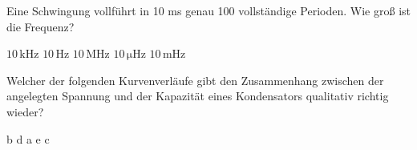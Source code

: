 \documentclass[11pt]{exam}
\begin{document}
\begin{questions}
\vspace{3mm}\question Eine Schwingung vollführt in 10 ms genau 100 vollständige Perioden. Wie groß ist die Frequenz?

\begin{choices}
	\choice \(\mathrm{10\,kHz}\)
	\choice \(\mathrm{10\,Hz}\)
	\choice \(\mathrm{10\,MHz}\)
	\choice \(\mathrm{10\,\mu Hz}\)
	\choice \(\mathrm{10\,mHz}\)
\end{choices}

\vspace{3mm}\question Welcher der folgenden Kurvenverläufe gibt den Zusammenhang zwischen der angelegten Spannung und der Kapazität eines Kondensators qualitativ richtig wieder?

\begin{choices}
	\choice b
	\choice d
	\choice a
	\choice e
	\choice c
\end{choices}

\vspace{3mm}\end{questions}
\end{document}
